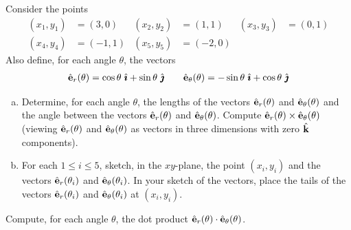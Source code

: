 \begin{question}\label{prb polar vectors}
Consider the points
\begin{align*}
(x_1,y_1) &= (3,0) &
(x_2,y_2) &= (1,1)  &
(x_3,y_3) &= (0,1) \\
(x_4,y_4) &= (-1,1) &
(x_5,y_5) &= (-2,0)
\end{align*}
Also define, for each angle $\theta$, the vectors
\begin{align*}
\hat{\mathbf{e}}_r(\theta)=\cos\theta\ \hat{\pmb{\imath}} + \sin\theta\ \hat{\pmb{\jmath}}\qquad
\hat{\mathbf{e}}_\theta(\theta) = -\sin\theta\ \hat{\pmb{\imath}} + \cos\theta\ \hat{\pmb{\jmath}}
\end{align*}
\begin{enumerate}[(a)]
\item
Determine, for each angle $\theta$, the lengths of the vectors
$\hat{\mathbf{e}}_r(\theta)$ and $\hat{\mathbf{e}}_\theta(\theta)$ and the angle between 
the vectors $\hat{\mathbf{e}}_r(\theta)$ and $\hat{\mathbf{e}}_\theta(\theta)$. Compute
$\hat{\mathbf{e}}_r(\theta)\times\hat{\mathbf{e}}_\theta(\theta)$ (viewing $\hat{\mathbf{e}}_r(\theta)$ and $\hat{\mathbf{e}}_\theta(\theta)$ as vectors in three dimensions with zero $\hat{\mathbf{k}}$ 
components).
\item
For each $1\le i\le 5$, sketch, in the $xy$-plane, the point $(x_i,y_i)$
and the vectors $\hat{\mathbf{e}}_r(\theta_i)$ and $\hat{\mathbf{e}}_\theta(\theta_i)$. In your
sketch of the vectors, place the tails of the vectors 
$\hat{\mathbf{e}}_r(\theta_i)$ and $\hat{\mathbf{e}}_\theta(\theta_i)$ at $(x_i,y_i)$.
\end{enumerate}
\end{question}

\begin{hint} 
Compute, for each angle $\theta$, the dot product $\hat{\mathbf{e}}_r(\theta)\cdot\hat{\mathbf{e}}_\theta(\theta)$.
\end{hint}


